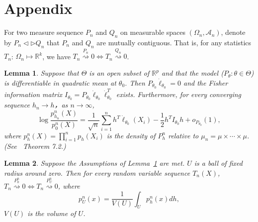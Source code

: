 \documentclass[review]{elsarticle}
\newtheorem{lemma}{Lemma}
\begin{document}
\section{Appendix}
For two measure sequence $P_n$ and $Q_n$ on measurable spaces $(\Omega_n,\mathcal{A}_n)$, denote by $P_n\triangleleft \triangleright Q_n$ that $P_n$ and $Q_n$ are mutually contiguous. That is, for any statistics $T_n$: $\Omega_n\mapsto \mathbb{R}^k$, we have $T_n\overset{P_n}{\rightsquigarrow}0\Leftrightarrow T_n\overset{Q_n}{\rightsquigarrow}0$.
\begin{lemma}\label{lemmaEx}
    Suppose that $\Theta$ is an open subset of $\mathbb{R}^p$ and that the model ($P_\theta: \theta \in\Theta$) is differentiable in quadratic mean at $\theta_0$. Then $P_{\theta_0}\dot{\ell}_{\theta_0}=0$ and the Fisher information matrix $I_{\theta_0}=P_{\theta_0}\dot{\ell}_{\theta_0}\dot{\ell}_{\theta_0}^T$ exists. Furthermore, for every converging sequence $h_n\to h$，as $n\to \infty$,
    \begin{equation}
        \log \frac{p^n_{h_n}(X)}{p^n_0(X)}=\frac{1}{\sqrt{n}}\sum^n_{i=1}h^T\dot{\ell}_{\theta_0}(X_i)-\frac{1}{2}h^T I_{\theta_0}h+o_{P_{\theta_0}}(1),
    \end{equation}
    where $p_h^n(X)=\prod_{i=1}^n p_h(X_i)$ is the density of $P_h^n$ relative to $\mu_n=\mu\times \cdots \times \mu$.
    (See~\cite{van2000asymptotic} Theorem 7.2.)
\end{lemma}



\begin{lemma}\label{lemmaContiguity}
    Suppose the Assumptions of Lemma~\ref{lemmaEx} are met. $U$ is a ball of fixed radius around zero. Then for every random variable sequence $T_n(X)$, $T_n\overset{P^n_0}{\rightsquigarrow}0\Leftrightarrow T_n\overset{P^n_U}{\rightsquigarrow}0$, where
\begin{equation}
    p^n_U(x)=\frac{1}{V(U)}\int_{U}p_h^n(x)dh,
\end{equation}
$V(U)$ is the volume of $U$.
\end{lemma}
\end{document}
